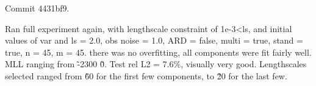 \documentclass[11pt,a4paper]{article}
\begin{document}
Commit 4431bf9.

Ran full experiment again, with lengthscale constraint of 1e-3<ls, and initial values of var and ls = 2.0, obs noise = 1.0, ARD = false, multi = true, stand = true, n = 45, m = 45.
there was no overfitting, all components were fit fairly well. 
MLL ranging from \~-2300 \- \~0.
Test rel L2 = 7.6\%, visually very good.
Lengthscales selected ranged from \~60 for the first few components, to \~20 for the last few.
\end{document}
